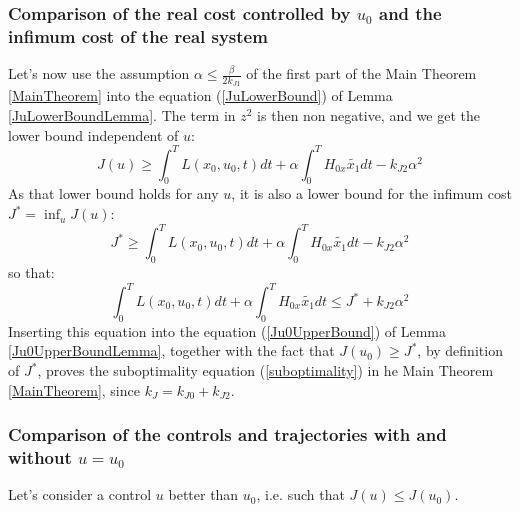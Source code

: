 \documentclass[a4paper,10pt]{article}
\begin{document}
\subsubsection{Comparison of the real cost controlled by $u_{0}$ and the 
infimum cost of the real system}\label{ProofSuboptimality}
Let's now use the assumption $\alpha \leq \frac{\beta}{2k_{J1}}$ of 
the first part of the Main Theorem \ref{MainTheorem} into the 
equation (\ref{JuLowerBound}) of Lemma \ref{JuLowerBoundLemma}. The 
term in $z^{2}$ is then non negative, and we get the lower bound 
independent of $u$:
\[
    J(u) \geq \int_{0}^{T} L(x_{0},u_{0},t) dt
	+ \alpha \int_{0}^{T} H_{0x} \tilde{x_{1}} dt
	- k_{J2}\alpha^{2}
\]
As that lower bound holds for any $u$, it is also a lower bound for 
the infimum cost  $J^{*}= \inf_{u}J(u)$:
\[
    J^{*} \geq \int_{0}^{T} L(x_{0},u_{0},t) dt
	+ \alpha \int_{0}^{T} H_{0x} \tilde{x_{1}} dt
	- k_{J2}\alpha^{2}
\]
so that:
\[
     \int_{0}^{T} L(x_{0},u_{0},t) dt
	+ \alpha \int_{0}^{T} H_{0x} \tilde{x_{1}} dt
	\leq J^{*} + k_{J2}\alpha^{2}
\]
Inserting this equation into the 
equation (\ref{Ju0UpperBound}) of Lemma \ref{Ju0UpperBoundLemma}, 
together with the fact that $J(u_{0}) \geq J^{*}$, by definition of 
$J^{*}$, proves the suboptimality equation (\ref{suboptimality}) in he Main Theorem 
\ref{MainTheorem}, since $k_{J}=k_{J0}+k_{J2}$.

\subsubsection{Comparison of the controls and trajectories with and 
without $u=u_{0}$}\label{TrajControlComp}
Let's consider a control $u$ better than $u_{0}$, i.e. such that 
$J(u) \leq J(u_{0})$.
\end{document}
